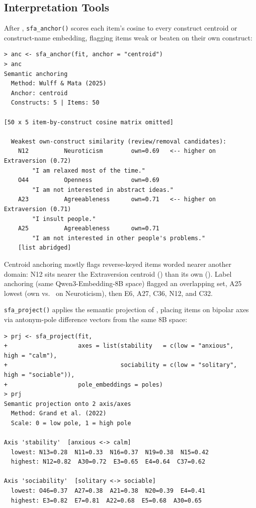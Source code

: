 \subsection{Interpretation Tools}

After \citet{wulff-mata-2025}, \texttt{sfa\_anchor()} scores each item's
cosine to every construct centroid or construct-name embedding, flagging
items weak or beaten on their own construct:

{\scriptsize
\begin{verbatim}
> anc <- sfa_anchor(fit, anchor = "centroid")
> anc
Semantic anchoring
  Method: Wulff & Mata (2025)
  Anchor: centroid
  Constructs: 5 | Items: 50

[50 x 5 item-by-construct cosine matrix omitted]

  Weakest own-construct similarity (review/removal candidates):
    N12          Neuroticism        own=0.69   <-- higher on Extraversion (0.72)
        "I am relaxed most of the time."
    O44          Openness           own=0.69
        "I am not interested in abstract ideas."
    A23          Agreeableness      own=0.71   <-- higher on Extraversion (0.71)
        "I insult people."
    A25          Agreeableness      own=0.71
        "I am not interested in other people's problems."
    [list abridged]
\end{verbatim}
}

Centroid anchoring mostly flags reverse-keyed items worded nearer another
domain: N12 sits nearer the Extraversion centroid (\valAnchorNTwRival) than its own
(\valAnchorNTwOwn). Label anchoring (same Qwen3-Embedding-8B space) flagged an
overlapping set, A25 lowest (own \valAnchorATwFiveOwn{} vs.\ \valAnchorATwFiveNeur{} on Neuroticism), then E6,
A27, C36, N12, and C32.

\texttt{sfa\_project()} applies the semantic projection of
\citet{grand-etal-2022}, placing items on bipolar axes via antonym-pole
difference vectors from the same 8B space:

{\scriptsize
\begin{verbatim}
> prj <- sfa_project(fit,
+                    axes = list(stability   = c(low = "anxious",  high = "calm"),
+                                sociability = c(low = "solitary", high = "sociable")),
+                    pole_embeddings = poles)
> prj
Semantic projection onto 2 axis/axes
  Method: Grand et al. (2022)
  Scale: 0 = low pole, 1 = high pole

Axis 'stability'  [anxious <-> calm]
  lowest: N13=0.28  N11=0.33  N16=0.37  N19=0.38  N15=0.42
  highest: N12=0.82  A30=0.72  E3=0.65  E4=0.64  C37=0.62

Axis 'sociability'  [solitary <-> sociable]
  lowest: O46=0.37  A27=0.38  A21=0.38  N20=0.39  E4=0.41
  highest: E3=0.82  E7=0.81  A22=0.68  E5=0.68  A30=0.65
\end{verbatim}
}

